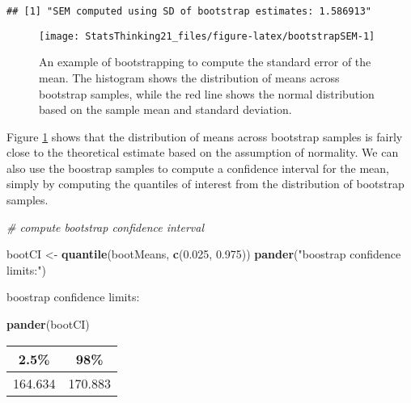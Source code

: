 \documentclass[]{book}
\newenvironment{Shaded}{\begin{snugshade}}{\end{snugshade}}
\newcommand{\KeywordTok}[1]{\textcolor[rgb]{0.13,0.29,0.53}{\textbf{#1}}}
\newcommand{\FloatTok}[1]{\textcolor[rgb]{0.00,0.00,0.81}{#1}}
\newcommand{\StringTok}[1]{\textcolor[rgb]{0.31,0.60,0.02}{#1}}
\newcommand{\CommentTok}[1]{\textcolor[rgb]{0.56,0.35,0.01}{\textit{#1}}}
\newcommand{\NormalTok}[1]{#1}
\theoremstyle{definition}
\theoremstyle{definition}
\theoremstyle{definition}
\theoremstyle{remark}
\begin{document}
\begin{verbatim}
## [1] "SEM computed using SD of bootstrap estimates: 1.586913"
\end{verbatim}

\begin{figure}
\texttt{[image: StatsThinking21\_files/figure-latex/bootstrapSEM-1]} \caption{An example of bootstrapping to compute the standard error of the mean. The histogram shows the distribution of means across bootstrap samples, while the red line shows the normal distribution based on the sample mean and standard deviation.}\label{fig:bootstrapSEM}
\end{figure}

Figure \ref{fig:bootstrapSEM} shows that the distribution of means
across bootstrap samples is fairly close to the theoretical estimate
based on the assumption of normality. We can also use the boostrap
samples to compute a confidence interval for the mean, simply by
computing the quantiles of interest from the distribution of bootstrap
samples.

\begin{Shaded}
\begin{Highlighting}[]
\CommentTok{# compute bootstrap confidence interval}

\NormalTok{bootCI <-}\StringTok{ }\KeywordTok{quantile}\NormalTok{(bootMeans, }\KeywordTok{c}\NormalTok{(}\FloatTok{0.025}\NormalTok{, }\FloatTok{0.975}\NormalTok{))}
\KeywordTok{pander}\NormalTok{(}\StringTok{"boostrap confidence limits:"}\NormalTok{)}
\end{Highlighting}
\end{Shaded}

boostrap confidence limits:

\begin{Shaded}
\begin{Highlighting}[]
\KeywordTok{pander}\NormalTok{(bootCI)}
\end{Highlighting}
\end{Shaded}

\begin{longtable}[]{@{}cc@{}}
\toprule
\begin{minipage}[b]{0.13\columnwidth}\centering\strut
2.5\%\strut
\end{minipage} & \begin{minipage}[b]{0.13\columnwidth}\centering\strut
98\%\strut
\end{minipage}\tabularnewline
\midrule
\endhead
\begin{minipage}[t]{0.13\columnwidth}\centering\strut
164.634\strut
\end{minipage} & \begin{minipage}[t]{0.13\columnwidth}\centering\strut
170.883\strut
\end{minipage}\tabularnewline
\bottomrule
\end{longtable}
\end{document}
